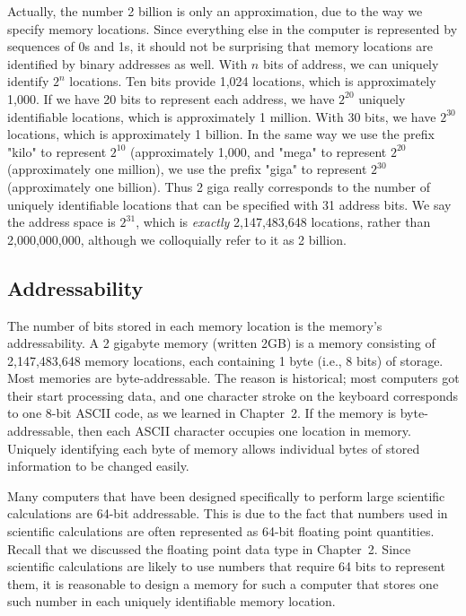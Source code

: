 \documentclass{patt}
\begin{document}
Actually, the number 2 billion is only an approximation, due to
the way we specify memory locations.  Since everything else in the
computer is represented by sequences of 0s and 1s, it should not be
surprising that memory locations are identified by binary addresses as
well.  With $n$ bits of address, we can uniquely identify $2^n$
locations.  Ten bits provide 1,024 locations, which is approximately
1,000.  If we have 20 bits to represent each address, we have $2^{20}$
uniquely identifiable locations, which is approximately 1 million.  With
30 bits, we have $2^{30}$ locations, which is approximately 1 billion.
In the same way we use the prefix "kilo" to represent $2^{10}$ (approximately
1,000, and "mega" to represent $2^{20}$ (approximately one million), we 
use the prefix "giga" to represent $2^{30}$ (approximately one billion).
Thus 2 giga really corresponds to the number of uniquely identifiable
locations that can be specified with 31 address bits.  We say the
address space is $2^{31}$, which is {\em exactly} 2,147,483,648 
locations, rather than 2,000,000,000, although we colloquially refer to
it as 2 billion.  

\subsection{Addressability}

The number of bits stored in each memory location is the memory's
addressability.  A 2 gigabyte memory (written 2GB) is a memory consisting of
2,147,483,648 memory locations, each containing 1 byte (i.e., 8 bits) of
storage.  Most memories are byte-addressable.  The reason is
historical; most computers got their start processing data, and one
character stroke on the keyboard corresponds to one 8-bit ASCII
code, as we learned in Chapter~2.  If the memory is
byte-addressable, then each ASCII character occupies one location in
memory.  Uniquely identifying each byte of memory allows individual
bytes of stored information to be changed easily.

Many computers that have been designed specifically to perform large
scientific calculations are 64-bit addressable.  This is due to the
fact that numbers used in scientific calculations are often
represented as 64-bit floating point quantities.  Recall that we
discussed the floating point data type in Chapter~2.  Since scientific
calculations are likely to use numbers that require 64 bits to
represent them, it is reasonable to design a memory for such a
computer that stores one such number in each uniquely identifiable
memory location.
\end{document}
